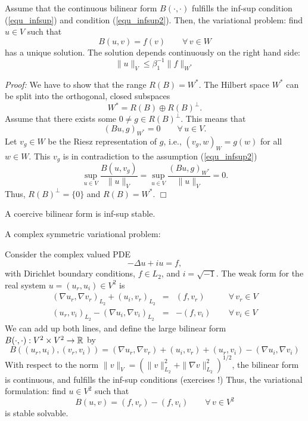\begin{theorem} \label{theo_infsup} 
Assume that the continuous bilinear form $B(\cdot,\cdot)$ fulfills
the inf-sup condition (\ref{equ_infsup}) and condition (\ref{equ_infsup2}). 
Then, the variational problem: find $u \in V$ such that
\begin{equation} \label{equ_bigsystem}
B(u,v) = f(v) \qquad \forall \, v \in W
\end{equation}
has a unique solution. The solution depends continuously on the right hand
side:
$$
\| u \|_V \leq \beta_1^{-1} \| f \|_{W^\ast}
$$
\end{theorem}
{\em Proof:} We have to show that the range $R(B) = W^\ast$. The Hilbert
space $W^\ast$ can be split into the orthogonal, closed subspaces
$$
W^\ast = R(B) \oplus R(B)^\bot.
$$
Assume that there exists some $0 \neq g \in R(B)^\bot$. This means that
$$
(B u, g)_{W^\ast} = 0 \qquad \forall \, u \in V.
$$
Let $v_g \in W$ be the Riesz representation of $g$, i.e., $(v_g, w)_W = g(w)$ for all $w \in W$. This $v_g$ is in contradiction to the assumption 
(\ref{equ_infsup2})
$$
\sup_{u \in V} \frac{B(u,v_g)}{ \| u \|_V} = 
\sup_{u \in V} \frac{(Bu,g)_{W^\ast}}{ \| u \|_V} = 
0.
$$
Thus, $R(B)^\bot = \{ 0 \}$ and $R(B) = W^\ast$.
\hfill $\Box$

\begin{example}A coercive bilinear form is inf-sup stable.
\end{example}
\begin{example}A complex symmetric variational problem:
\end{example}
\noindent
Consider the complex valued PDE 
$$
-\Delta u + i u = f,
$$
with Dirichlet boundary conditions, $f \in L_2$, and $i = \sqrt{-1}$. The
weak form for the real system $u = (u_{r}, u_i) \in V^2$ is
\begin{equation}
\begin{array}{rcll}
(\nabla u_{r}, \nabla v_{r})_{L_2} + (u_i, v_{r})_{L_2} & = &
        (f,v_{r}) \qquad & \forall \, v_r \in V \\
(u_{r}, v_i)_{L_2} -(\nabla u_i, \nabla v_i)_{L_2} & = &
        -(f,v_i) & \forall \, v_i \in V
\end{array}
\end{equation}
We can add up both lines, and define the large bilinear form $B(\cdot,\cdot) : V^2 \times V^2 \rightarrow {\mathbb R}$ by
$$
B ((u_r,u_i), (v_r, v_i)) = 
(\nabla u_{r}, \nabla v_{r}) + (u_i, v_{r}) + (u_{r}, v_i) -(\nabla u_i, \nabla v_i)
$$
With respect to the norm $\|v\|_V = ( \| v \|_{L_2}^2 + \| \nabla v \|_{L_2}^2)^{1/2}$, the bilinear form is continuous, and fulfills the inf-sup conditions
(exercises !)
Thus, the variational formulation: find $u \in V^2$ such that
$$
B(u,v) = (f,v_r) - (f,v_i) \qquad \forall \, v \in V^2
$$
is stable solvable.

